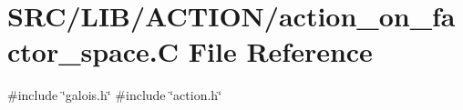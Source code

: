 \hypertarget{action__on__factor__space_8_c}{}\section{S\+R\+C/\+L\+I\+B/\+A\+C\+T\+I\+O\+N/action\+\_\+on\+\_\+factor\+\_\+space.C File Reference}
\label{action__on__factor__space_8_c}
{\ttfamily \#include \char`\"{}galois.\+h\char`\"{}}\newline
{\ttfamily \#include \char`\"{}action.\+h\char`\"{}}\newline
